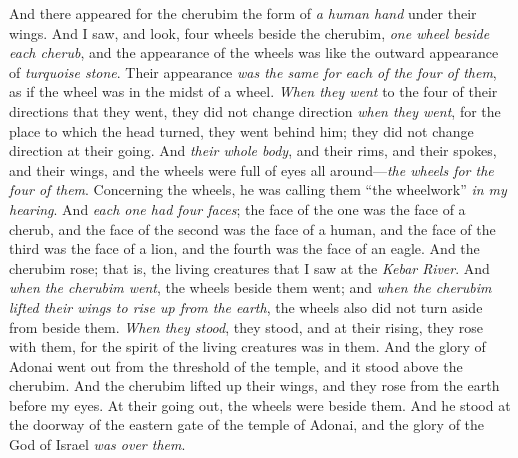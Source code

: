 \begin{biblechapter}
\verse And there appeared for the cherubim the form of \textit{a human hand} under their wings.
\verse And I saw, and look, four wheels beside the cherubim, \textit{one wheel beside each cherub}, and the appearance of the wheels was like the outward appearance of \textit{turquoise stone}.
\verse Their appearance \textit{was the same for each of the four of them}, as if the wheel was in the midst of a wheel.
\verse \textit{When they went} to the four of their directions that they went, they did not change direction \textit{when they went}, for the place to which the head turned, they went behind him; they did not change direction at their going.
\verse And \textit{their whole body}, and their rims, and their spokes, and their wings, and the wheels were full of eyes all around—\textit{the wheels for the four of them}.
\verse Concerning the wheels, he was calling them “the wheelwork” \textit{in my hearing}.
\verse And \textit{each one had four faces}; the face of the one was the face of a cherub, and the face of the second was the face of a human, and the face of the third was the face of a lion, and the fourth was the face of an eagle.
\verse And the cherubim rose; that is, the living creatures that I saw at the \textit{Kebar River}.
\verse And \textit{when the cherubim went}, the wheels beside them went; and \textit{when the cherubim lifted their wings to rise up from the earth}, the wheels also did not turn aside from beside them.
\verse \textit{When they stood}, they stood, and at their rising, they rose with them, for the spirit of the living creatures was in them.
\verse And the glory of Adonai went out from the threshold of the temple, and it stood above the cherubim.
\verse And the cherubim lifted up their wings, and they rose from the earth before my eyes. At their going out, the wheels were beside them. And he stood at the doorway of the eastern gate of the temple of Adonai, and the glory of the God of Israel \textit{was over them}.

\end{biblechapter}
